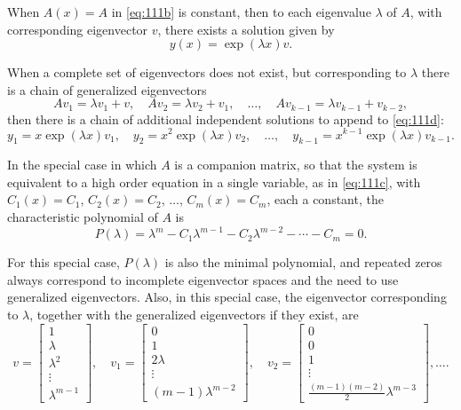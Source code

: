 \begin{theorem}
When $A(x) = A$ in \eqref{eq:111b} is constant, then to each eigenvalue $\lambda$ of $A$, with corresponding eigenvector $v$, there exists a solution given by
\[
y(x) = \exp(\lambda x) v. \tag{111d}
\]

When a complete set of eigenvectors does not exist, but corresponding to $\lambda$ there is a chain of generalized eigenvectors
\[
A v_1 = \lambda v_1 + v, \quad A v_2 = \lambda v_2 + v_1, \quad \dots, \quad A v_{k-1} = \lambda v_{k-1} + v_{k-2},
\]
then there is a chain of additional independent solutions to append to \eqref{eq:111d}:
\[
y_1 = x \exp(\lambda x) v_1, \quad y_2 = x^2 \exp(\lambda x) v_2, \quad \dots, \quad y_{k-1} = x^{k-1} \exp(\lambda x) v_{k-1}.
\]

In the special case in which $A$ is a companion matrix, so that the system is equivalent to a high order equation in a single variable, as in \eqref{eq:111c}, with $C_1(x) = C_1$, $C_2(x) = C_2$, $\dots$, $C_m(x) = C_m$, each a constant, the characteristic polynomial of $A$ is
\[
P(\lambda) = \lambda^m - C_1 \lambda^{m-1} - C_2 \lambda^{m-2} - \cdots - C_m = 0.
\]

For this special case, $P(\lambda)$ is also the minimal polynomial, and repeated zeros always correspond to incomplete eigenvector spaces and the need to use generalized eigenvectors. Also, in this special case, the eigenvector corresponding to $\lambda$, together with the generalized eigenvectors if they exist, are
\[
v = \begin{bmatrix} 1 \\ \lambda \\ \lambda^2 \\ \vdots \\ \lambda^{m-1} \end{bmatrix}, \quad v_1 = \begin{bmatrix} 0 \\ 1 \\ 2\lambda \\ \vdots \\ (m-1)\lambda^{m-2} \end{bmatrix}, \quad v_2 = \begin{bmatrix} 0 \\ 0 \\ 1 \\ \vdots \\ \frac{(m-1)(m-2)}{2} \lambda^{m-3} \end{bmatrix}, \dots .
\]
\end{theorem}


